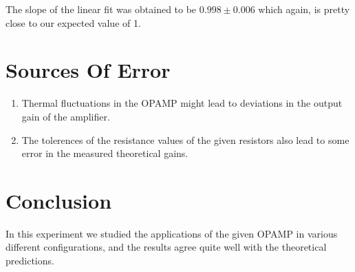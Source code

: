 \documentclass[10pt]{scrartcl}
\theoremstyle{definition}
\begin{document}
The slope of the linear fit was obtained to be $0.998 \pm 0.006$ which again, is pretty close to our expected
value of 1.
\section{Sources Of Error}
\begin{enumerate}
    \item Thermal fluctuations in the OPAMP might lead to deviations in the output gain of the 
        amplifier.
    \item The tolerences of the resistance values of the given resistors also lead to some error 
        in the measured theoretical gains.
    
\end{enumerate}
\section{Conclusion}
In this experiment we studied the applications of the given OPAMP in various different configurations, and the results agree quite well
with the theoretical predictions.
\clearpage
\end{document}
